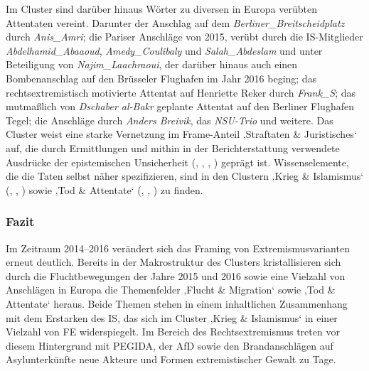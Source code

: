 Im Cluster  sind darüber hinaus Wörter zu diversen in Europa verübten Attentaten vereint. Darunter der Anschlag auf dem \emph{Berliner\_Breitscheidplatz} durch \emph{Anis\_Amri}; die Pariser Anschläge von 2015, verübt durch die IS-Mitglieder \emph{Abdelhamid\_Abaaoud}, \emph{Amedy\_Coulibaly} und \emph{Salah\_Abdeslam} und unter Beteiligung von \emph{Najim\_Laachraoui}, der darüber hinaus auch einen Bombenanschlag auf den Brüsseler Flughafen im Jahr 2016 beging; das rechtsextremistisch motivierte Attentat auf Henriette Reker durch \emph{Frank\_S}; das mutmaßlich von \emph{Dschaber al-Bakr} geplante Attentat auf den Berliner Flughafen Tegel; die Anschläge durch \emph{Anders Breivik}, das \emph{NSU-Trio} und weitere. Das Cluster weist eine starke Vernetzung im Frame-Anteil ‚Straftaten \& Juristisches` auf, die durch Ermittlungen und mithin in der Berichterstattung verwendete Ausdrücke der epistemischen Unsicherheit (, , , ) geprägt ist. Wissenselemente, die die Taten selbst näher spezifizieren, sind in den Clustern ‚Krieg \& Islamismus` (, , ) sowie ‚Tod \& Attentate` (, , ) zu finden.

\subsubsection{Fazit}\label{fazit-5}

Im Zeitraum 2014--2016 verändert sich das Framing von Extremismusvarianten erneut deutlich. Bereits in der Makrostruktur des Clusters kristallisieren sich durch die Fluchtbewegungen der Jahre 2015 und 2016 sowie eine Vielzahl von Anschlägen in Europa die Themenfelder ‚Flucht \& Migration` sowie ‚Tod \& Attentate` heraus. Beide Themen stehen in einem inhaltlichen Zusammenhang mit dem Erstarken des IS, das sich im Cluster ‚Krieg \& Islamismus` in einer Vielzahl von FE widerspiegelt. Im Bereich des Rechtsextremismus treten vor diesem Hintergrund mit PEGIDA, der AfD sowie den Brandanschlägen auf Asylunterkünfte neue Akteure und Formen extremistischer Gewalt zu Tage.

